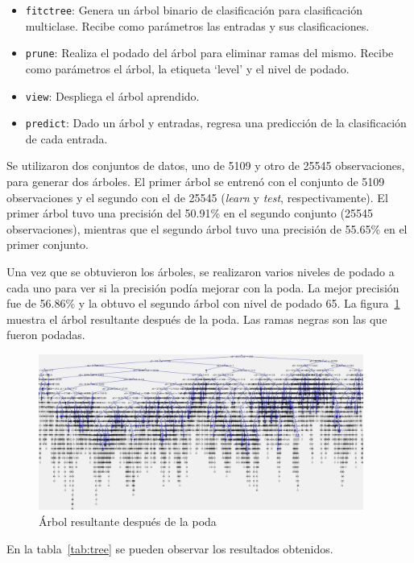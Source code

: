 \documentclass{llncs}
\begin{document}
\begin{itemize}
	\item \texttt{fitctree}: Genera un árbol binario de clasificación para clasificación multiclase.
	Recibe como parámetros las entradas y sus clasificaciones.
	\item \texttt{prune}: Realiza el podado del árbol para eliminar ramas del mismo.
	Recibe como parámetros el árbol, la etiqueta ‘level’ y el nivel de podado.
	\item \texttt{view}: Despliega el árbol aprendido.
	\item \texttt{predict}: Dado un árbol y entradas, regresa una predicción de la clasificación de cada entrada.
\end{itemize}

Se utilizaron dos conjuntos de datos, uno de 5109 y otro de 25545 observaciones, para generar dos árboles.
El primer árbol se entrenó con el conjunto de 5109 observaciones y el segundo con el de 25545 (\textit{learn} y \textit{test}, respectivamente).
El primer árbol tuvo una precisión del 50.91\% en el segundo conjunto (25545 observaciones),
mientras que el segundo árbol tuvo una precisión de 55.65\% en el primer conjunto.

Una vez que se obtuvieron los árboles, se realizaron varios niveles de podado a cada uno para ver si la precisión podía mejorar con la poda.
La mejor precisión fue de 56.86\% y la obtuvo el segundo árbol con nivel de podado 65.
La figura~\ref{fig:tree} muestra el árbol resultante después de la poda.
Las ramas negras son las que fueron podadas.

\begin{figure}[htbp]
	\centering
	\includegraphics[width=0.95\textwidth]{04-tree}
	\caption{Árbol resultante después de la poda}
	\label{fig:tree}
\end{figure}

En la tabla~\ref{tab:tree} se pueden observar los resultados obtenidos.
\end{document}
